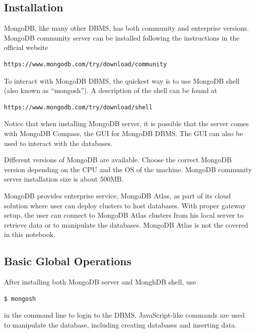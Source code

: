 \subsection{Installation}

MongoDB, like many other DBMS, has both community and enterprise versions. MongoDB community server can be installed following the instructions in the official website
\begin{lstlisting}
https://www.mongodb.com/try/download/community
\end{lstlisting}
To interact with MongoDB DBMS, the quickest way is to use MongoDB shell (also known as ``mongosh''). A description of the shell can be found at
\begin{lstlisting}
https://www.mongodb.com/try/download/shell
\end{lstlisting}
Notice that when installing MongoDB server, it is possible that the server comes with MongoDB Compass, the GUI for MongoDB DBMS. The GUI can also be used to interact with the databases.

Different versions of MongoDB are available. Choose the correct MongoDB version depending on the CPU and the OS of the machine. MongoDB community server installation size is about 500MB.

MongoDB provides enterprise service, MongoDB Atlas, as part of its cloud solution where user can deploy clusters to host databases. With proper gateway setup, the user can connect to MongoDB Atlas clusters from his local server to retrieve data or to manipulate the databases. MongoDB Atlas is not the covered in this notebook.

\subsection{Basic Global Operations}

After installing both MongoDB server and MonghDB shell, use
\begin{lstlisting}
$ mongosh
\end{lstlisting}
in the command line to login to the DBMS. JavaScript-like commands are used to manipulate the database, including creating databases and inserting data.

